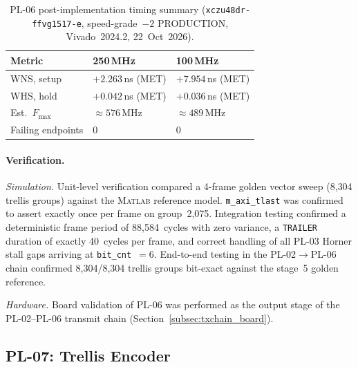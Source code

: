 \vspace{-30pt}
\leavevmode\par
\begin{table}[!h]
  \caption{PL-06 post-implementation timing summary
           (\texttt{xczu48dr\allowbreak-ffvg1517\allowbreak-e}, speed-grade~$-2$
           PRODUCTION, Vivado~2024.2, 22~Oct~2026).}
  \label{tab:pl06_timing}
  \centering
  \begin{tabular}{lll}
    \hline
    Metric             & 250\,MHz             & 100\,MHz            \\
    \hline
    WNS, setup         & $+2.263$\,ns (MET)   & $+7.954$\,ns (MET)  \\[2pt]
    WHS, hold          & $+0.042$\,ns (MET)   & $+0.036$\,ns (MET)  \\[2pt]
    Est.\ $F_{\max}$   & $\approx 576$\,MHz   & $\approx 489$\,MHz   \\[2pt]
    Failing endpoints  & 0                    & 0                   \\
    \hline
  \end{tabular}
\end{table}
\FloatBarrier


\FloatBarrier
\paragraph{Verification.}

\textit{Simulation.}
Unit-level verification compared a 4-frame golden vector sweep
(8{,}304 trellis groups) against the \textsc{Matlab} reference model.
\texttt{m\_axi\_tlast} was confirmed to assert exactly once per frame on
group~2{,}075.
Integration testing confirmed a deterministic frame period of
88{,}584~cycles with zero variance, a \texttt{TRAILER} duration of exactly
40~cycles per frame, and correct handling of all PL-03 Horner stall gaps
arriving at \texttt{bit\_cnt}~$= 6$.
End-to-end testing in the PL-02$\to$PL-06 chain confirmed
8{,}304/8{,}304 trellis groups bit-exact against the stage~5 golden
reference.

\textit{Hardware.}
Board validation of PL-06 was performed as the output stage of the
PL-02--PL-06 transmit chain (Section~\ref{subsec:txchain_board}).


\subsection{PL-07: Trellis Encoder}
\label{subsec:pl07}

